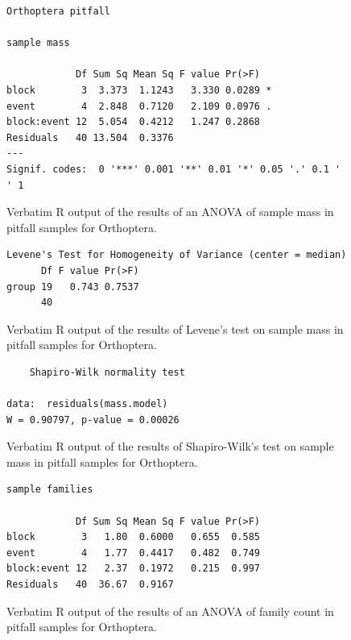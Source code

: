 \documentclass[10pt,letterpaper,twocolumn]{article}
\begin{document}
\begin{figure}[h]
	\lstset{numbers=left}
	\lstset{xleftmargin=5mm,framexleftmargin=5mm}
	\begin{lstlisting}
Orthoptera pitfall 

sample mass 

            Df Sum Sq Mean Sq F value Pr(>F)  
block        3  3.373  1.1243   3.330 0.0289 *
event        4  2.848  0.7120   2.109 0.0976 .
block:event 12  5.054  0.4212   1.247 0.2868  
Residuals   40 13.504  0.3376                 
---
Signif. codes:  0 '***' 0.001 '**' 0.01 '*' 0.05 '.' 0.1 ' ' 1
	\end{lstlisting}
	\caption{Verbatim R output of the results of an ANOVA of sample mass in pitfall samples for Orthoptera.}
	\label{fig:pitfall_orthoptera_mass_anova}
	\smallskip
	\nointerlineskip
	\hrulefill
\end{figure}

\begin{figure}[h]
	\lstset{numbers=left}
	\lstset{xleftmargin=5mm,framexleftmargin=5mm}
	\begin{lstlisting}
Levene's Test for Homogeneity of Variance (center = median)
      Df F value Pr(>F)
group 19   0.743 0.7537
      40               
	\end{lstlisting}
	\caption{Verbatim R output of the results of Levene's test on sample mass in pitfall samples for Orthoptera.}
	\label{fig:pitfall_orthoptera_mass_levene}
	\smallskip
	\nointerlineskip
	\hrulefill
\end{figure}

\begin{figure}[h]
	\lstset{numbers=left}
	\lstset{xleftmargin=5mm,framexleftmargin=5mm}
	\begin{lstlisting}
	Shapiro-Wilk normality test

data:  residuals(mass.model)
W = 0.90797, p-value = 0.00026
	\end{lstlisting}
	\caption{Verbatim R output of the results of Shapiro-Wilk's test on sample mass in pitfall samples for Orthoptera.}
	\label{fig:pitfall_orthoptera_mass_shapiro}
	\smallskip
	\nointerlineskip
	\hrulefill
\end{figure}

\begin{figure}[h]
	\lstset{numbers=left}
	\lstset{xleftmargin=5mm,framexleftmargin=5mm}
	\begin{lstlisting}
sample families 

            Df Sum Sq Mean Sq F value Pr(>F)
block        3   1.80  0.6000   0.655  0.585
event        4   1.77  0.4417   0.482  0.749
block:event 12   2.37  0.1972   0.215  0.997
Residuals   40  36.67  0.9167               
	\end{lstlisting}
	\caption{Verbatim R output of the results of an ANOVA of family count in pitfall samples for Orthoptera.}
	\label{fig:pitfall_orthoptera_family_anova}
	\smallskip
	\nointerlineskip
	\hrulefill
\end{figure}
\end{document}
